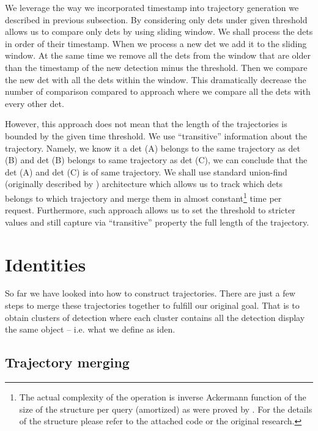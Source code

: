 We leverage the way we incorporated timestamp into trajectory generation
we described in previous subsection. By considering only
\glspl{det} under given threshold allows us to compare only \glspl{det} by using
sliding window. We shall process the \glspl{det} in order of their timestamp.
When we process a new \gls{det} we add it to the sliding window. At the same
time we remove all the \glspl{det} from the window that are older than the
timestamp of the new detection minus the threshold. Then we compare the new
\gls{det} with all the \glspl{det} within the window. This dramatically decrease
the number of comparison compared to approach where we compare all the
\glspl{det} with every other \gls{det}.

However, this approach does not mean that the length of the trajectories is
bounded by the given time threshold. We use ``transitive'' information about
the trajectory. Namely, we know it a \gls{det} (A) belongs to the same
trajectory as \gls{det} (B) and \gls{det} (B) belongs to same trajectory as 
\gls{det} (C), we can conclude that the \gls{det} (A) and \gls{det} (C) is of
same trajectory. We shall use standard union-find (originally described by
\cite{galler1964improved}) architecture which allows us to track which \glspl{det} belongs to which trajectory and merge them in almost
constant\footnote{The actual complexity of the operation is inverse
Ackermann function of the size of the structure per query (amortized) as were
proved by \cite{tarjan1984worst}. For the details of the structure please refer
to the attached code or the original research.} time per request.
Furthermore, such approach allows us
to set the threshold to stricter values and still capture via ``transitive''
property the full length of the trajectory.

\section{Identities}

\label{sec:generating_identities}

So far we have looked into how to construct trajectories.
There are just a few steps to merge these trajectories together to fulfill
our original goal. That is to obtain clusters of detection where each cluster
contains all the detection display the same object -- i.e. what we define
as \gls{iden}.

\subsection{Trajectory merging}

